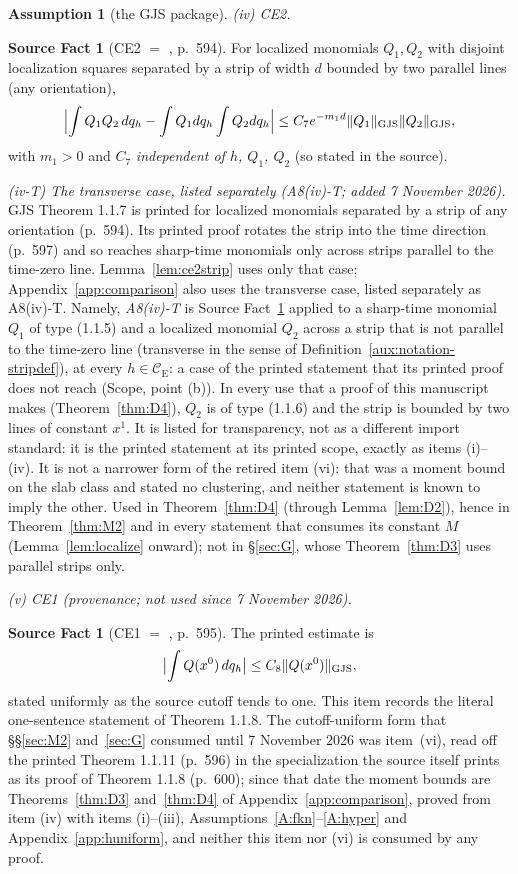 \documentclass[11pt,a4paper]{article}
\theoremstyle{plain}
\theoremstyle{definition}
\newtheorem{srcfact}[theorem]{Source Fact}
\newtheorem{assumption}{Assumption}
\theoremstyle{plain}
\theoremstyle{definition}
\newcommand{\CE}{\mathcal{C}_{\mathrm E}}
\begin{document}
\begin{assumption}[the GJS package]
\emph{(iv) CE2.}
\begin{srcfact}[CE2 $=$ {\cite[Thm.~1.1.7]{GJS}}, p.~594]\label{sf:CE2}
For localized monomials $Q_1,Q_2$ with disjoint localization squares separated by a strip of
width $d$ bounded by two parallel lines (any orientation),
\[
  \Bigl|\int Q_1Q_2\,dq_h-\int Q_1dq_h\int Q_2dq_h\Bigr|\le C_7e^{-m_1d}\|Q_1\|_{\rm GJS}\|Q_2\|_{\rm GJS} ,
\]
with $m_1>0$ and $C_7$ \emph{independent of $h$, $Q_1$, $Q_2$} (so stated in the source).
\end{srcfact}

\emph{(iv-T) The transverse case, listed separately (A8(iv)-T; added 7 November 2026).}
GJS Theorem 1.1.7 is printed for localized monomials separated by a strip of any
orientation (p.~594). Its printed proof rotates the strip into the time direction
(p.~597) and so reaches sharp-time monomials only across strips parallel to the time-zero
line. Lemma~\ref{lem:ce2strip} uses only that case; Appendix~\ref{app:comparison} also uses
the transverse case, listed separately as A8(iv)-T.  Namely, \emph{A8(iv)-T} is Source
Fact~\ref{sf:CE2} applied to a sharp-time monomial $Q_1$ of type (1.1.5) and a localized
monomial $Q_2$ across a strip that is not parallel to the time-zero line (transverse in the
sense of Definition~\ref{aux:notation-stripdef}), at every $h\in\CE$: a case of the printed
statement that its printed proof does not reach (Scope, point (b)).  In every use that a
proof of this manuscript makes (Theorem~\ref{thm:D4}), $Q_2$ is of type (1.1.6) and the strip
is bounded by two lines of constant $x^1$.  It is
listed for transparency, not as a different import standard: it is the printed statement
at its printed scope, exactly as items (i)--(iv).  It is not a narrower form of the retired
item (vi): that was a moment bound on the slab class and stated no clustering, and neither
statement is known to imply the other.  Used in Theorem~\ref{thm:D4} (through
Lemma~\ref{lem:D2}), hence in Theorem~\ref{thm:M2} and in every statement that consumes its
constant $M$ (Lemma~\ref{lem:localize} onward); not in \S\ref{sec:G}, whose
Theorem~\ref{thm:D3} uses parallel strips only.

\emph{(v) CE1 (provenance; not used since 7 November 2026).}
\begin{srcfact}[CE1 $=$ {\cite[Thm.~1.1.8]{GJS}}, p.~595]\label{sf:CE1}
The printed estimate is
\[
 \bigl|\int Q(x^0)\,dq_h\bigr|\le C_8\|Q(x^0)\|_{\rm GJS},
\]
stated uniformly as the source cutoff tends to one.  This item records the literal
one-sentence statement of Theorem 1.1.8.  The cutoff-uniform form that \S\S\ref{sec:M2}
and~\ref{sec:G} consumed until 7 November 2026 was item~(vi), read off the printed Theorem
1.1.11 (p.~596) in the specialization the source itself prints as its proof of Theorem 1.1.8
(p.~600); since that date the moment bounds are Theorems~\ref{thm:D3} and~\ref{thm:D4} of
Appendix~\ref{app:comparison}, proved from item (iv) with items (i)--(iii),
Assumptions~\ref{A:fkn}--\ref{A:hyper} and Appendix~\ref{app:huniform}, and neither this item
nor (vi) is consumed by any proof.
\end{srcfact}


\end{assumption}
\end{document}

